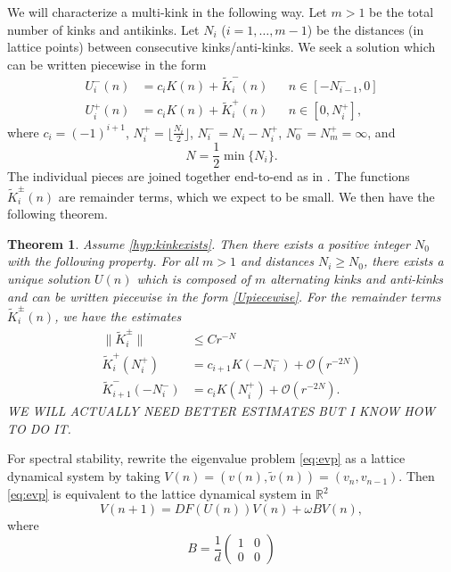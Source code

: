 \documentclass[12pt]{article}
\def\R{{\mathbb R}}
\newtheorem{theorem}{Theorem}
\begin{document}
We will characterize a multi-kink in the following way. Let $m > 1$ be the total number of kinks and antikinks. Let $N_i$ ($i = 1, \dots, m-1$) be the distances (in lattice points) between consecutive kinks/anti-kinks. We seek a solution which can be written piecewise in the form 
\begin{equation}\label{Upiecewise}
\begin{aligned}
U_i^-(n) &= c_i K(n) + \tilde{K}_i^-(n) && n \in [-N_{i-1}^-, 0] \\
U_i^+(n) &= c_i K(n) + \tilde{K}_i^+(n) && n \in [0, N_i^+],
\end{aligned}
\end{equation}
where $c_i = (-1)^{i+1}$, $N_i^+ = \lfloor \frac{N_i}{2} \rfloor$, $N_i^- = N_i - N_i^+$, $N_0^- = N_m^+ = \infty$, and
\begin{equation}\label{defN}
N = \frac{1}{2} \min\{ N_i \}.
\end{equation}
The individual pieces are joined together end-to-end as in \cite{Sandstede1998}. The functions $\tilde{K}_i^\pm(n)$ are remainder terms, which we expect to be small. We then have the following theorem.

\begin{theorem}\label{th:KaKexists}
Assume \cref{hyp:kinkexists}. Then there exists a positive integer $N_0$ with the following property. For all $m > 1$ and distances $N_i \geq N_0$, there exists a unique solution $U(n)$ which is composed of $m$ alternating kinks and anti-kinks and can be written piecewise in the form \cref{Upiecewise}. For the remainder terms $\tilde{K}_i^\pm(n)$, we have the estimates
\begin{equation}\label{eq:Westimates}
\begin{aligned}
\|\tilde{K}_i^\pm\| &\leq C r^{-N} \\
\tilde{K}_i^+(N_i^+) &= c_{i+1} K(-N_i^-) + \mathcal{O}(r^{-2N}) \\
\tilde{K}_{i+1}^-(-N_i^-) &= c_i K(N_i^+) + \mathcal{O}(r^{-2N}) .
\end{aligned}
\end{equation}
WE WILL ACTUALLY NEED BETTER ESTIMATES BUT I KNOW HOW TO DO IT.
\end{theorem}

For spectral stability, rewrite the eigenvalue problem \cref{eq:evp} as a lattice dynamical system by taking $V(n) = (v(n), \tilde{v}(n)) = (v_n, v_{n-1})$. Then \cref{eq:evp} is equivalent to the lattice dynamical system in $\R^2$
\begin{equation}\label{eq:EVPdyneq}
V(n+1) = D F( U(n) )V(n) + \omega B V(n),
\end{equation}
where
\[
B = \frac{1}{d}
\begin{pmatrix}1 & 0 \\ 0 & 0
\end{pmatrix}
\] 
\end{document}
